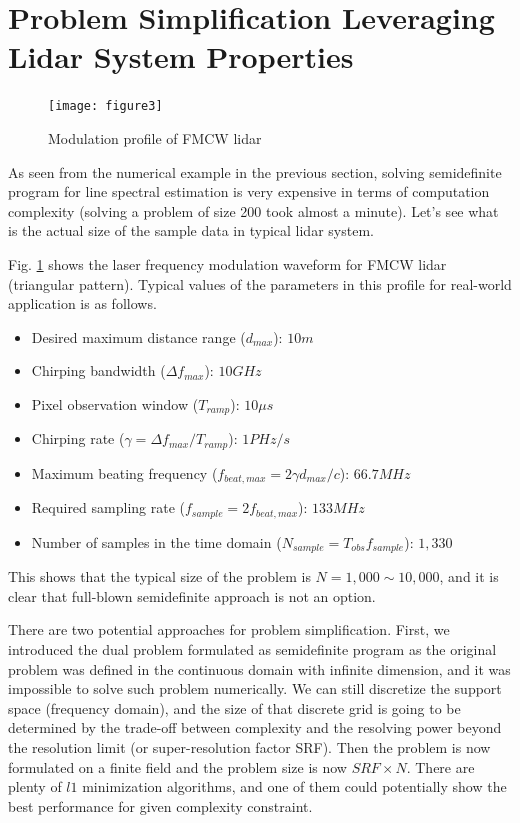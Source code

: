 \documentclass[11pt,journal, onecolumn]{IEEEtran}
\theoremstyle{theorem}
\begin{document}
\section{
    Problem Simplification Leveraging Lidar System Properties
}\label{sec:secfour}

\begin{figure}[t!]
\centering
\vspace{-0.1in}
\texttt{[image: figure3]}
\caption{Modulation profile of FMCW lidar \cite{behnam}}
\vspace{-0.3in}
\label{lidarsignal}
\end{figure}


As seen from the numerical example in the previous section, solving semidefinite program for line spectral estimation is very expensive in terms of computation complexity (solving a problem of size 200 took almost a minute). Let's see what is the actual size of the sample data in typical lidar system.

Fig. \ref{lidarsignal} \cite{behnam} shows the laser frequency modulation waveform for FMCW lidar (triangular pattern). Typical values of the parameters in this profile for real-world application is as follows.

\begin{itemize}
    \item Desired maximum distance range ($d_{max}$): $10m$
    \item Chirping bandwidth ($\Delta f_{max}$): $10GHz$
    \item Pixel observation window ($T_{ramp}$): $10\mu s$
    \item Chirping rate ($\gamma=\Delta f_{max}/T_{ramp}$): $1PHz/s$
    \item Maximum beating frequency ($f_{beat,max} = 2\gamma d_{max}/c$): $66.7MHz$
    \item Required sampling rate ($f_{sample} = 2f_{beat,max}$): $133MHz$
    \item Number of samples in the time domain ($N_{sample} = T_{obs}f_{sample}$): $1,330$
\end{itemize}

\noindent This shows that the typical size of the problem is $N=1,000\sim10,000$, and it is clear that full-blown semidefinite approach is not an option.

There are two potential approaches for problem simplification. First, we introduced the dual problem formulated as semidefinite program as the original problem was defined in the continuous domain with infinite dimension, and it was impossible to solve such problem numerically. We can still discretize the support space (frequency domain), and the size of that discrete grid is going to be determined by the trade-off between complexity and the resolving power beyond the resolution limit (or super-resolution factor SRF). Then the problem is now formulated on a finite field and the problem size is now $SRF \times N$. There are plenty of $l1$ minimization algorithms, and one of them could potentially show the best performance for given complexity constraint.
\end{document}
